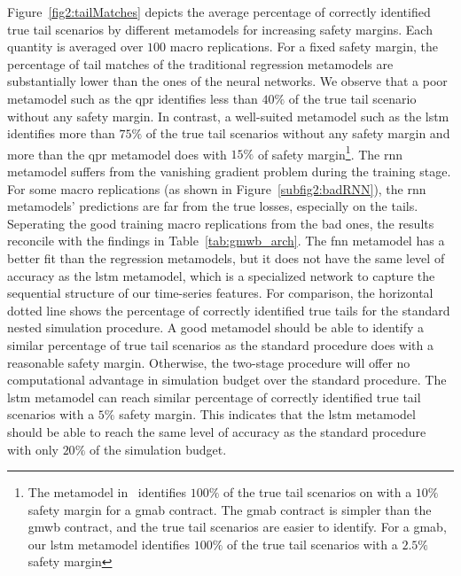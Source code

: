 Figure~\ref{fig2:tailMatches} depicts the average percentage of correctly identified true tail scenarios by different metamodels for increasing safety margins.
Each quantity is averaged over $100$ macro replications.
For a fixed safety margin, the percentage of tail matches of the traditional regression metamodels are substantially lower than the ones of the neural networks.
We observe that a poor metamodel such as the \gls{qpr} identifies less than $40\%$ of the true tail scenario without any safety margin.
In contrast, a well-suited metamodel such as the \gls{lstm} identifies more than $75\%$ of the true tail scenarios without any safety margin and more than the \gls{qpr} metamodel does with $15\%$ of safety margin\footnote{The metamodel in~\cite{dang2020efficient} identifies $100\%$ of the true tail scenarios on with a $10\%$ safety margin for a \gls{gmab} contract.
The \gls{gmab} contract is simpler than the \gls{gmwb} contract, and the true tail scenarios are easier to identify. 
For a \gls{gmab}, our \gls{lstm} metamodel identifies $100\%$ of the true tail scenarios with a $2.5\%$ safety margin}.
The \gls{rnn} metamodel suffers from the vanishing gradient problem during the training stage. 
For some macro replications (as shown in Figure~\ref{subfig2:badRNN}), the \gls{rnn} metamodels' predictions are far from the true losses, especially on the tails.
Seperating the good training macro replications from the bad ones, the results reconcile with the findings in Table~\ref{tab:gmwb_arch}.
The \gls{fnn} metamodel has a better fit than the regression metamodels, but it does not have the same level of accuracy as the \gls{lstm} metamodel, which is a specialized network to capture the sequential structure of our time-series features.
For comparison, the horizontal dotted line shows the percentage of correctly identified true tails for the standard nested simulation procedure.
A good metamodel should be able to identify a similar percentage of true tail scenarios as the standard procedure does with a reasonable safety margin.
Otherwise, the two-stage procedure will offer no computational advantage in simulation budget over the standard procedure.
The \gls{lstm} metamodel can reach similar percentage of correctly identified true tail scenarios with a $5\%$ safety margin.
This indicates that the \gls{lstm} metamodel should be able to reach the same level of accuracy as the standard procedure with only $20\%$ of the simulation budget.

